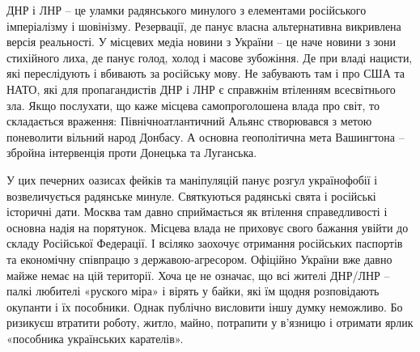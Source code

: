 ДНР і ЛНР – це уламки радянського минулого з елементами російського
імперіалізму і шовінізму. Резервації, де панує власна альтернативна викривлена
версія реальності. У місцевих медіа новини з України – це наче новини з зони
стихійного лиха, де панує голод, холод і масове зубожіння. Де при владі
нацисти, які переслідують і вбивають за російську мову. Не забувають там і про
США та НАТО, які для пропагандистів ДНР і ЛНР є справжнім втіленням
всесвітнього зла. Якщо послухати, що каже місцева самопроголошена влада про
світ, то складається враження: Північноатлантичний Альянс створювався з метою
поневолити вільний народ Донбасу. А основна геополітична мета Вашингтона –
збройна інтервенція проти Донецька та Луганська.


У цих печерних оазисах фейків та маніпуляцій панує розгул українофобії і
возвеличується радянське минуле. Святкуються радянські свята і російські
історичні дати. Москва там давно сприймається як втілення справедливості і
основна надія на порятунок. Місцева влада не приховує свого бажання увійти до
складу Російської Федерації. І всіляко заохочує отримання російських паспортів
та економічну співпрацю з державою-агресором. Офіційно України вже давно майже
немає на цій території. Хоча це не означає, що всі жителі ДНР/ЛНР – палкі
любителі «руского міра» і вірять у байки, які їм щодня розповідають окупанти і
їх пособники. Однак публічно висловити іншу думку неможливо. Бо ризикуєш
втратити роботу, житло, майно, потрапити у в’язницю і отримати ярлик «пособника
українських карателів».
